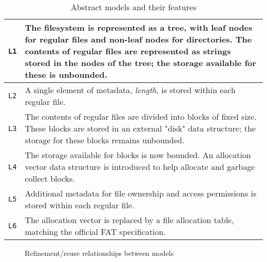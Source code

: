 \documentclass[submission,copyright,creativecommons]{eptcs}
\begin{document}
\begin{table}[]
  \centering
  \caption{Abstract models and their features}
  \label{abstract-model-description-table}
  \begin{tabular}{|l|p{120mm}|}
    \hline
    \texttt{L1} & The filesystem is represented as a tree, with leaf
    nodes for regular files and non-leaf nodes for
    directories. The contents of regular files are represented as
    strings stored in the nodes of the tree; the storage available for
    these is unbounded. \\ \hline
    \texttt{L2} & A single element of metadata, \textit{length}, is
    stored within each regular file.  \\ \hline
    \texttt{L3} & The contents of regular files are divided into
    blocks of fixed size. These blocks are stored in an external
    "disk" data structure; the storage for these blocks remains
    unbounded. \\ \hline
    \texttt{L4} & The storage available for blocks is now bounded. An
    allocation vector data structure is introduced to help allocate
    and garbage collect blocks. \\ \hline
    \texttt{L5} & Additional metadata for file ownership and access
    permissions is stored within each regular file. \\ \hline
    \texttt{L6} & The allocation vector is replaced by a file
    allocation table, matching the official FAT specification. \\ \hline
  \end{tabular}
\end{table}

\begin{figure}
  \centering
  \caption{Refinement/reuse relationships between models}
  \label{refinement-figure}
\end{figure}
\end{document}
